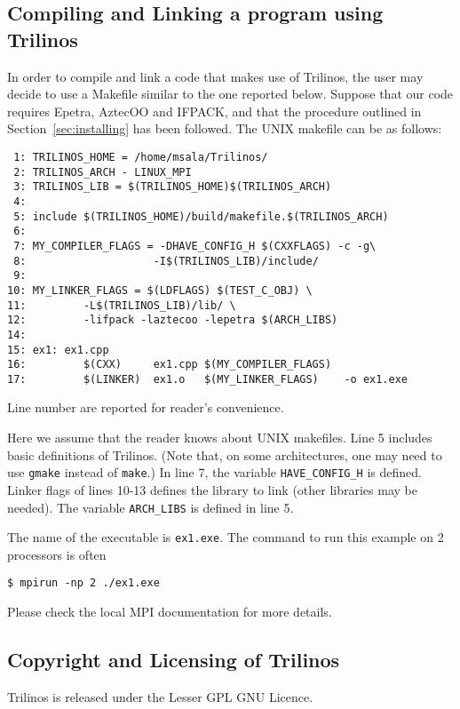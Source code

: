 
\subsection{Compiling and Linking a program using Trilinos}
\label{sec:intro_compiling}

In order to compile and link a code that makes use of Trilinos, the user
may decide to use a Makefile similar to the one reported below. 
Suppose that our code requires Epetra, AztecOO and IFPACK, and that
the procedure outlined in Section~\ref{sec:installing} has been followed.
The UNIX makefile can be as follows:
\begin{verbatim}
 1: TRILINOS_HOME = /home/msala/Trilinos/
 2: TRILINOS_ARCH - LINUX_MPI
 3: TRILINOS_LIB = $(TRILINOS_HOME)$(TRILINOS_ARCH)
 4: 
 5: include $(TRILINOS_HOME)/build/makefile.$(TRILINOS_ARCH)
 6: 
 7: MY_COMPILER_FLAGS = -DHAVE_CONFIG_H $(CXXFLAGS) -c -g\
 8:                    -I$(TRILINOS_LIB)/include/
 9:
10: MY_LINKER_FLAGS = $(LDFLAGS) $(TEST_C_OBJ) \
11:         -L$(TRILINOS_LIB)/lib/ \
12:         -lifpack -laztecoo -lepetra $(ARCH_LIBS)
14:
15: ex1: ex1.cpp
16:         $(CXX)     ex1.cpp $(MY_COMPILER_FLAGS)
17:         $(LINKER)  ex1.o   $(MY_LINKER_FLAGS)    -o ex1.exe
\end{verbatim}

Line number are reported for reader's convenience.

Here we assume that the reader knows about UNIX makefiles.  Line 5
includes basic definitions of Trilinos. (Note that, on some
architectures, one may need to use \verb!gmake! instead of \verb!make!.)
In line 7, the variable \verb!HAVE_CONFIG_H! is defined. Linker flags of
lines 10-13 defines the library to link (other libraries may be needed).
The variable \verb!ARCH_LIBS! is defined in line 5.

The name of the executable is \verb!ex1.exe!. 
The command to run this example on 2 processors is often
\begin{verbatim}
$ mpirun -np 2 ./ex1.exe
\end{verbatim}
Please check the local MPI documentation for more details. 


\subsection{Copyright and Licensing of Trilinos}
\label{sec:copyright}

Trilinos is released under the Lesser GPL GNU Licence.

